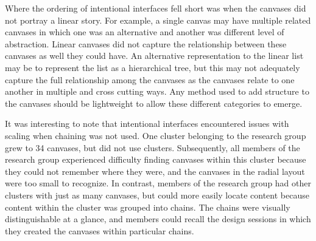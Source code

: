 Where the ordering of intentional interfaces fell short was when the canvases did not portray a linear story. For example, a single canvas may have multiple related canvases in which one was an alternative and another was different level of abstraction. Linear canvases did not capture the relationship between these canvases as well they could have. An alternative representation to the linear list may be to represent the list as a hierarchical tree, but this may not adequately capture the full relationship among the canvases as the canvases relate to one another in multiple and cross cutting ways. Any method used to add structure to the canvases should be lightweight to allow these different categories to emerge.

It was interesting to note that intentional interfaces encountered issues with scaling when chaining was not used. One cluster belonging to the research group grew to 34 canvases, but did not use clusters. Subsequently, all members of the research group experienced difficulty finding canvases within this cluster because they could not remember where they were, and the canvases in the radial layout were too small to recognize. In contrast, members of the research group had other clusters with just as many canvases, but could more easily locate content because content within the cluster was grouped into chains. The chains were visually distinguishable at a glance, and members could recall the design sessions in which they created the canvases within particular chains.

